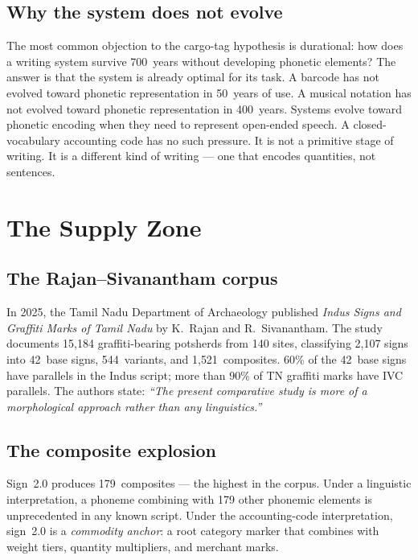 \subsection{Why the system does not evolve}

The most common objection to the cargo-tag hypothesis is
durational: how does a writing system survive 700~years without
developing phonetic elements? The answer is that the system is
already optimal for its task. A barcode has not evolved toward
phonetic representation in 50~years of use. A musical notation
has not evolved toward phonetic representation in 400~years.
Systems evolve toward phonetic encoding when they need to represent
open-ended speech. A closed-vocabulary accounting code has no such
pressure. It is not a primitive stage of writing. It is a different
kind of writing --- one that encodes quantities, not sentences.

\section{The Supply Zone}

\subsection{The Rajan--Sivanantham corpus}

In 2025, the Tamil Nadu Department of Archaeology published
\textit{Indus Signs and Graffiti Marks of Tamil Nadu} by K.\ Rajan
and R.\ Sivanantham.\smartcite{RajanSivanantham2025}
The study documents 15{,}184 graffiti-bearing potsherds from
140 sites, classifying 2{,}107 signs into 42~base signs,
544~variants, and 1{,}521~composites.
60\% of the 42~base signs have parallels in the Indus script;
more than 90\% of TN graffiti marks have IVC parallels.
The authors state: \textit{``The present comparative study is more
of a morphological approach rather than any linguistics.''}

\subsection{The composite explosion}

Sign~2.0 produces 179~composites --- the highest in the corpus.
Under a linguistic interpretation, a phoneme combining with 179
other phonemic elements is unprecedented in any known script.
Under the accounting-code interpretation, sign~2.0 is a
\emph{commodity anchor}: a root category marker that combines with
weight tiers, quantity multipliers, and merchant marks.

